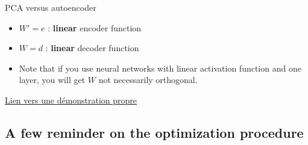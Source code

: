 \documentclass[compress,10pt]{beamer}
\begin{document}

\begin{frame}{PCA versus autoencoder}
\protect\hypertarget{pca-versus-autoencoder-1}{}
\begin{itemize}
\item
  \(W' = e\) : \textbf{linear} encoder function
\item
  \(W = d\) : \textbf{linear} decoder function
\item
  Note that if you use neural networks with linear activation function
  and one layer, you will get \(W\) not necessarily orthogonal.
\end{itemize}

\href{http://www.xavierdupre.fr/app/mlstatpy/helpsphinx/c_ml/rn/rn_9_auto.html}{Lien
vers une démonstration propre}
\end{frame}


\subsection{A few reminder on the optimization procedure}
\end{document}
